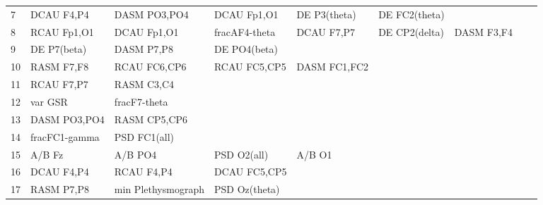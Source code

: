 \begin{landscape}
\begin{table}[]
\begin{tabular}{l|llllllll}
7                  & DCAU F4,P4           & DASM PO3,PO4            & DCAU Fp1,O1          & DE P3(theta)       & DE FC2(theta)         &                      &                 &                 \\
8                  & RCAU Fp1,O1          & DCAU Fp1,O1             & fracAF4-theta        & DCAU F7,P7         & DE CP2(delta)         & DASM F3,F4           &                 &                 \\
9                  & DE P7(beta)          & DASM P7,P8              & DE PO4(beta)         &                    &                       &                      &                 &                 \\
10                 & RASM F7,F8           & RCAU FC6,CP6            & RCAU FC5,CP5         & DASM FC1,FC2       &                       &                      &                 &                 \\
11                 & RCAU F7,P7           & RASM C3,C4              &                      &                    &                       &                      &                 &                 \\
12                 & var GSR              & fracF7-theta            &                      &                    &                       &                      &                 &                 \\
13                 & DASM PO3,PO4         & RASM CP5,CP6            &                      &                    &                       &                      &                 &                 \\
14                 & fracFC1-gamma        & PSD FC1(all)            &                      &                    &                       &                      &                 &                 \\
15                 & A/B Fz               & A/B PO4                 & PSD O2(all)          & A/B O1             &                       &                      &                 &                 \\
16                 & DCAU F4,P4           & RCAU F4,P4              & DCAU FC5,CP5         &                    &                       &                      &                 &                 \\
17                 & RASM P7,P8           & min Plethysmograph      & PSD Oz(theta)        &                    &                       &                      &                 &                 \\

\end{tabular}
\end{table}
\end{landscape}
